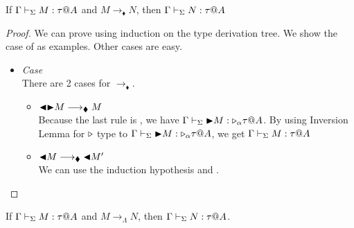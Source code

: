 \begin{theorem}
	If $\G\V M:\tau@A$ and $M\longrightarrow_\blacklozenge N$, then $\G\V N:\tau@A$\\
\end{theorem}
	
\begin{proof}
	We can prove using induction on the type derivation tree.
	We show the case of \TTBL{} as examples.
	Other cases are easy.
	\begin{itemize}
		\newcommand{\R}{\longrightarrow_{\blacklozenge}}
																	
		\item \textit{Case} \TTBL{}\\
		      There are 2 cases for $\R$.
		      \begin{itemize}
		      	\item $\TBL\TB M \R M$\\
		      	      Because the last rule is \TTBL, we have $\Gamma \vdash_\Sigma {\mathop{\blacktriangleright}} M : {\mathop{\triangleright}}_\alpha \tau @A$.
		      	      By using Inversion Lemma for ${\mathop{\triangleright}}$ type to $\Gamma \vdash_\Sigma {\mathop{\blacktriangleright}} M : {\mathop{\triangleright}}_\alpha \tau @A$,
		      	      we get $\Gamma \vdash_\Sigma M : \tau @A$
		      	\item $\TBL M \R \TBL M'$\\
		      	      We can use the induction hypothesis and \TTBL.
		      \end{itemize}
	\end{itemize}
\end{proof}

\begin{theorem}
	If $\G\V M:\tau@A$ and $M \longrightarrow_{\Lambda} N$, then $\G\V N:\tau@A$.
\end{theorem}
	

